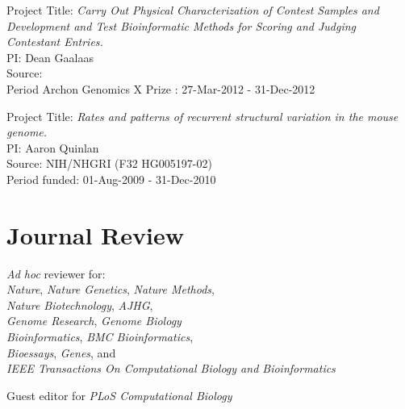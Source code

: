 \documentclass[margin,line]{cv}
\begin{document}
\begin{resume}
    \vspace{-2mm}
    Project Title: \textit{Carry Out Physical Characterization of Contest Samples and Development and Test Bioinformatic Methods for Scoring and Judging Contestant Entries.}\\
    PI: Dean Gaalaas\\
    Source: \\
    Period Archon Genomics X Prize : 27-Mar-2012 - 31-Dec-2012

    \vspace{-2mm}
    Project Title: \textit{Rates and patterns of recurrent structural variation in the mouse genome.}\\
    PI: Aaron Quinlan\\
    Source: NIH/NHGRI (F32 HG005197-02)\\
    Period funded: 01-Aug-2009 - 31-Dec-2010

    \section{\mysidestyle Journal Review}
    \textit{Ad hoc} reviewer for:\\
        \textit{Nature}, \textit{Nature Genetics}, \textit{Nature Methods},\\
        \textit{Nature Biotechnology}, \textit{AJHG}, \\
        \textit{Genome Research}, \textit{Genome Biology}\\
	      \textit{Bioinformatics}, \textit{BMC Bioinformatics},\\
          \textit{Bioessays}, \textit{Genes}, and \\
        \textit{IEEE Transactions On Computational Biology and Bioinformatics}

    Guest editor for \textit{PLoS Computational Biology}


\end{resume}
\end{document}
